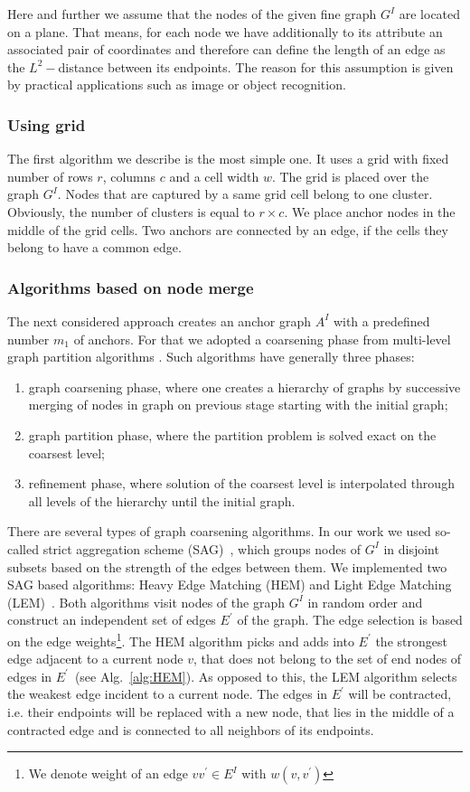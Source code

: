 Here and further we assume that the nodes of the given fine graph $G^I$ are located on a plane. That means, for each node we have additionally to its attribute an associated pair of coordinates and therefore can define the length of an edge as the $L^2-$distance between its endpoints. The reason for this assumption is given by practical applications such as image or object recognition.
\subsubsection{Using grid}	
The first algorithm we describe is the most simple one. It uses a grid with fixed number of rows $r$, columns $c$ and a cell width $w$. The grid is placed over the graph $G^I$. Nodes that are captured by a same grid cell belong to one cluster. Obviously, the number of clusters is equal to $r\times c$. We place anchor nodes in the middle of the grid cells. Two anchors are connected by an edge, if the cells they belong to have a common edge.
\subsubsection{Algorithms based on node merge}
The next considered approach creates an anchor graph $A^I$ with a predefined number $m_1$ of anchors. For that we adopted a coarsening phase from multi-level graph partition algorithms \cite{Chevalier09_GP,Hendrickson1995,Karypis95_GP,Safro2012_GC}.
Such algorithms have generally three phases: 
\begin{enumerate}
	\item graph coarsening phase, where one creates a hierarchy of graphs by successive merging of nodes in graph on previous stage starting with the initial graph;
	\item graph partition phase, where the partition problem is solved exact on the coarsest level;
	\item refinement phase, where solution of the coarsest level is interpolated through all levels of the hierarchy until the initial graph.
\end{enumerate}
There are several types of graph coarsening algorithms. In our work we used so-called strict aggregation scheme (SAG)~\cite{Chevalier09_GP}, which groups nodes of $G^I$ in disjoint subsets based on the strength of the edges between them. We implemented two SAG based algorithms: Heavy Edge Matching (HEM) and Light Edge Matching (LEM)~\cite{Chevalier09_GP}. Both algorithms visit nodes of the graph $G^I$ in random order and construct an independent set of edges $E^\prime$ of the graph. The edge selection is based on the edge weights\footnote{We denote weight of an edge $vv^\prime\in E^I$ with $w(v,v^\prime)$}. The HEM algorithm picks and adds into $E^\prime$ the strongest edge adjacent to a current node $v$, that does not belong to the set of end nodes of edges in $E^\prime$~(see Alg.~\ref{alg:HEM}). As opposed to this, the LEM algorithm selects the weakest edge incident to a current node. The edges in $E^\prime$ will be contracted, i.e. their endpoints will be replaced with a new node, that lies in the middle of a contracted edge and is connected to all neighbors of its endpoints.

